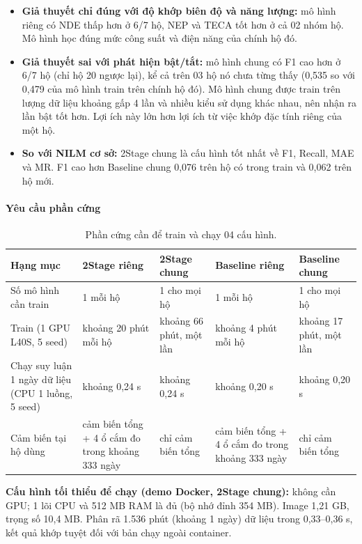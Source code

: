 \begin{itemize}
\item \textbf{Giả thuyết chỉ đúng với độ khớp biên độ và năng lượng:} mô hình riêng có NDE thấp hơn ở 6/7 hộ, NEP và TECA tốt hơn ở cả 02 nhóm hộ. Mô hình học đúng mức công suất và điện năng của chính hộ đó.
\item \textbf{Giả thuyết sai với phát hiện bật/tắt:} mô hình chung có F1 cao hơn ở 6/7 hộ (chỉ hộ 20 ngược lại), kể cả trên 03 hộ nó chưa từng thấy (0,535 so với 0,479 của mô hình train trên chính hộ đó). Mô hình chung được train trên lượng dữ liệu khoảng gấp 4 lần và nhiều kiểu sử dụng khác nhau, nên nhận ra lần bật tốt hơn. Lợi ích này lớn hơn lợi ích từ việc khớp đặc tính riêng của một hộ.
\item \textbf{So với NILM cơ sở:} 2Stage chung là cấu hình tốt nhất về F1, Recall, MAE và MR. F1 cao hơn Baseline chung 0,076 trên hộ có trong train và 0,062 trên hộ mới.
\end{itemize}

\paragraph{Yêu cầu phần cứng}


\begin{table}[H]
\centering
\caption{Phần cứng cần để train và chạy 04 cấu hình.}\label{nilm:tab18}
\small
\setlength{\tabcolsep}{3.5pt}\renewcommand{\arraystretch}{1.12}
\begin{tabularx}{\linewidth}{|X|X|l|X|l|}
\hline
\textbf{Hạng mục} & \textbf{2Stage riêng} & \textbf{2Stage chung} & \textbf{Baseline riêng} & \textbf{Baseline chung} \\ \hline
Số mô hình cần train & 1 mỗi hộ & 1 cho mọi hộ & 1 mỗi hộ & 1 cho mọi hộ \\ \hline
Train (1 GPU L40S, 5 seed) & khoảng 20 phút mỗi hộ & khoảng 66 phút, một lần & khoảng 4 phút mỗi hộ & khoảng 17 phút, một lần \\ \hline
Chạy suy luận 1 ngày dữ liệu (CPU 1 luồng, 5 seed) & khoảng 0,24 s & khoảng 0,24 s & khoảng 0,20 s & khoảng 0,20 s \\ \hline
Cảm biến tại hộ dùng & cảm biến tổng + 4 ổ cắm đo trong khoảng 333 ngày & chỉ cảm biến tổng & cảm biến tổng + 4 ổ cắm đo trong khoảng 333 ngày & chỉ cảm biến tổng \\ \hline
\end{tabularx}
\end{table}

\textbf{Cấu hình tối thiểu để chạy (demo Docker, 2Stage chung):} không cần GPU; 1 lõi CPU và 512 MB RAM là đủ (bộ nhớ đỉnh 354 MB). Image 1,21 GB, trọng số 10,4 MB. Phân rã 1.536 phút (khoảng 1 ngày) dữ liệu trong 0,33–0,36 s, kết quả khớp tuyệt đối với bản chạy ngoài container.


